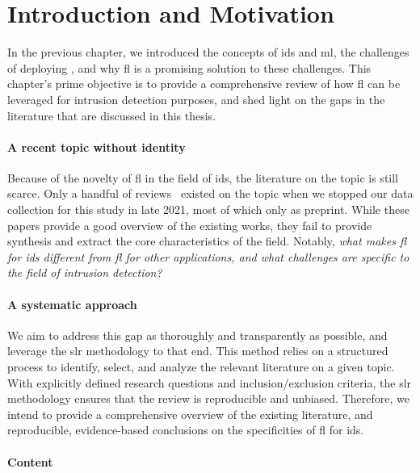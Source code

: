 \section{Introduction and Motivation\label{sec:sota.intro}}

In the previous chapter, we introduced the concepts of \acrfull{ids} and \acrfull{ml}, the challenges of deploying , and why \acrfull{fl} is a promising solution to these challenges. 
This chapter's prime objective is to provide a comprehensive review of how \gls{fl} can be leveraged for intrusion detection purposes, and shed light on the gaps in the literature that are discussed in this thesis.

\paragraph{A recent topic without identity}

Because of the novelty of \gls{fl} in the field of \gls{ids}, the literature on the topic is still scarce.
Only a handful of reviews~\cite{alazab_FederatedLearningCybersecurity_2021,agrawal_FederatedLearningintrusion_2022,campos_EvaluatingFederatedLearning_2022} existed on the topic when we stopped our data collection for this study in late 2021, most of which only as preprint.
While these papers provide a good overview of the existing works, they fail to provide synthesis and extract the core characteristics of the field.
Notably, \emph{what makes \gls{fl} for \gls{ids} different from \gls{fl} for other applications, and what challenges are specific to the field of intrusion detection?}


\paragraph{A systematic approach}

We aim to address this gap as thoroughly and transparently as possible, and leverage the \acrfull{slr} methodology to that end.
This method relies on a structured process to identify, select, and analyze the relevant literature on a given topic.
With explicitly defined research questions and inclusion/exclusion criteria, the \gls{slr} methodology ensures that the review is reproducible and unbiased.
Therefore, we intend to provide a comprehensive overview of the existing literature, and reproducible, evidence-based conclusions on the specificities of \gls{fl} for \gls{ids}.

\paragraph{Content}


